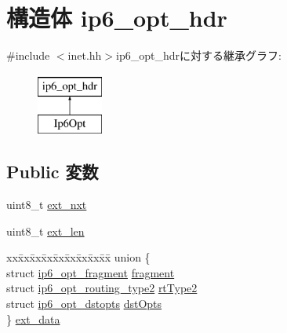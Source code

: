 \hypertarget{structNet_1_1ip6__opt__hdr}{
\section{構造体 ip6\_\-opt\_\-hdr}
\label{structNet_1_1ip6__opt__hdr}
}


{\ttfamily \#include $<$inet.hh$>$}ip6\_\-opt\_\-hdrに対する継承グラフ:\begin{figure}[H]
\begin{center}
\leavevmode
\includegraphics[height=2cm]{structNet_1_1ip6__opt__hdr}
\end{center}
\end{figure}
\subsection*{Public 変数}
\begin{DoxyCompactItemize}
\item 
uint8\_\-t \hyperlink{structNet_1_1ip6__opt__hdr_ac7f9555ba1faa017dc2ff39b58aff8ce}{ext\_\-nxt}
\item 
uint8\_\-t \hyperlink{structNet_1_1ip6__opt__hdr_ad0620f7d472e8ff6fb14a61d1cbbc9c9}{ext\_\-len}
\item 
\begin{tabbing}
xx\=xx\=xx\=xx\=xx\=xx\=xx\=xx\=xx\=\kill
union \{\\
\>struct \hyperlink{structNet_1_1ip6__opt__fragment}{ip6\_opt\_fragment} \hyperlink{structNet_1_1ip6__opt__hdr_a18673b2f11c7baba50d70623efe6406f}{fragment}\\
\>struct \hyperlink{structNet_1_1ip6__opt__routing__type2}{ip6\_opt\_routing\_type2} \hyperlink{structNet_1_1ip6__opt__hdr_a2f52f6b4de93b55e73dbe318c454a120}{rtType2}\\
\>struct \hyperlink{structNet_1_1ip6__opt__dstopts}{ip6\_opt\_dstopts} \hyperlink{structNet_1_1ip6__opt__hdr_ac28fafaa7bdaffb93818229fc6f825f3}{dstOpts}\\
\} \hyperlink{structNet_1_1ip6__opt__hdr_a267f25744ac328d55f93bc5bc9b11eed}{ext\_data}\\

\end{tabbing}\end{DoxyCompactItemize}


